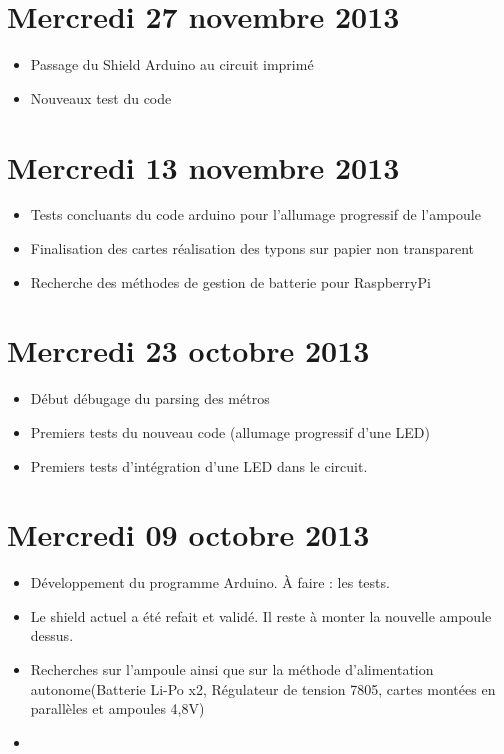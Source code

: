 	\section{Mercredi 27 novembre 2013} %
	\label{sec:mercredi_13_novembre_2013}
	\begin{itemize}
		\item Passage du Shield Arduino au circuit imprimé
		\item Nouveaux test du code
	\end{itemize}


	\section{Mercredi 13 novembre 2013} %
	\label{sec:mercredi_13_novembre_2013}
	\begin{itemize}
		\item Tests concluants du code arduino pour l'allumage progressif de l'ampoule
		\item Finalisation des cartes réalisation des typons sur papier non transparent
		\item Recherche des méthodes de gestion de batterie pour RaspberryPi
	\end{itemize}


	\section{Mercredi 23 octobre 2013} %
	\label{sec:mercredi_23_octobre_2013}
	\begin{itemize}
		\item Début débugage du parsing des métros 
		\item Premiers tests du nouveau code (allumage progressif d'une LED)
		\item Premiers tests d'intégration d'une LED dans le circuit.
	\end{itemize}
	

	\section{Mercredi 09 octobre 2013} %
	\label{sec:mercredi_09_octobre_2013}
	\begin{itemize}
		\item Développement du programme Arduino. À faire : les tests.
		\item Le shield actuel a été refait et validé. Il reste à monter la nouvelle ampoule dessus.
		\item Recherches sur l'ampoule ainsi que sur la méthode d'alimentation autonome(Batterie Li-Po x2, Régulateur de tension 7805, cartes montées en parallèles et ampoules 4,8V)
		\item
	\end{itemize}

